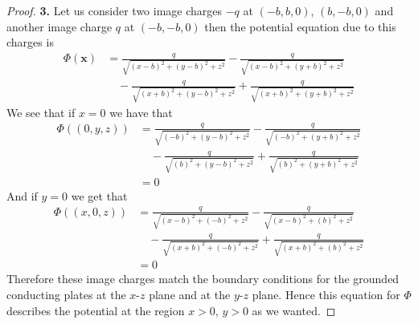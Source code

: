 \documentclass[11pt]{article}
\theoremstyle{definition}
\begin{document}
\cleardoublepage
\begin{proof}{\textbf{3.}}
    Let us consider two image charges $-q$ at $(-b, b, 0)$, $(b, -b, 0)$ and 
    another image charge $q$ at $(-b, -b, 0)$ then the potential equation due
    to this charges is 
    \begin{align*}
        \Phi(\bm{x}) &= \frac{q}{\sqrt{(x-b)^2 + (y-b)^2 + z^2}}
        - \frac{q}{\sqrt{(x-b)^2 + (y+b)^2 + z^2}}\\
        &\quad - \frac{q}{\sqrt{(x+b)^2 + (y-b)^2 + z^2}}
        + \frac{q}{\sqrt{(x+b)^2 + (y+b)^2 + z^2}}
    \end{align*}
    We see that if $x = 0$ we have that 
    \begin{align*}
        \Phi((0,y,z)) &= \frac{q}{\sqrt{(-b)^2 + (y-b)^2 + z^2}}
        - \frac{q}{\sqrt{(-b)^2 + (y+b)^2 + z^2}}\\
        &\quad - \frac{q}{\sqrt{(b)^2 + (y-b)^2 + z^2}}
        + \frac{q}{\sqrt{(b)^2 + (y+b)^2 + z^2}}\\
        &= 0
    \end{align*}
    And if $y = 0$ we get that
    \begin{align*}
        \Phi((x,0,z)) &= \frac{q}{\sqrt{(x-b)^2 + (-b)^2 + z^2}}
        - \frac{q}{\sqrt{(x-b)^2 + (b)^2 + z^2}}\\
        &\quad - \frac{q}{\sqrt{(x+b)^2 + (-b)^2 + z^2}}
        + \frac{q}{\sqrt{(x+b)^2 + (b)^2 + z^2}}\\
        &= 0 
    \end{align*}
    Therefore these image charges match the boundary conditions for the
    grounded conducting plates at the $x$-$z$ plane and at the $y$-$z$ plane.
    Hence this equation for $\Phi$ describes the potential at the region
    $x>0$, $y>0$ as we wanted.


\end{proof}
\end{document}
